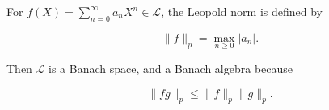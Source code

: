For $f(X) = \sum_{n=0}^{\infty} a_n X^n \in \mathcal{L}$, the Leopold norm is defined by

$$\|f\|_p = \max_{n \ge 0} |a_n|.$$

Then $\mathcal{L}$ is a Banach space, and a Banach algebra because

$$\|fg\|_p \le \|f\|_p \|g\|_p.$$
